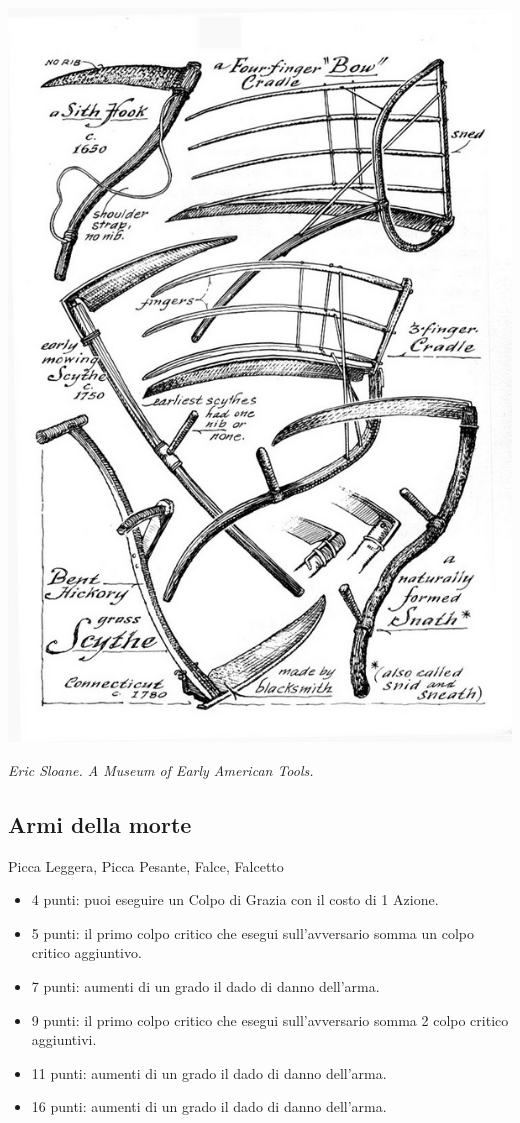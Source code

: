 \begin{multicols}{2}
\begin{itemize}[leftmargin=*]
\end{itemize}

\begin{center}
	\includegraphics[width=0.6\linewidth]{immagini/scythe-types.png}

	\emph{Eric Sloane. A Museum of Early American Tools.}

\end{center}

\subsection{Armi della morte} Picca Leggera, Picca Pesante, Falce, Falcetto\label{listaarmidelamorte}

\begin{itemize}[leftmargin=*] \setlength{\itemsep}{0pt}
\item 4 punti: puoi eseguire un Colpo di Grazia con il costo di 1 Azione.
\item 5 punti: il primo colpo critico che esegui sull'avversario somma un colpo critico aggiuntivo.
\item 7 punti: aumenti di un grado il dado di danno dell'arma.
\item 9 punti: il primo colpo critico che esegui sull'avversario somma 2 colpo critico aggiuntivi.
\item 11 punti: aumenti di un grado il dado di danno dell'arma.
\item 16 punti: aumenti di un grado il dado di danno dell'arma.
\end{itemize}


\end{multicols}
